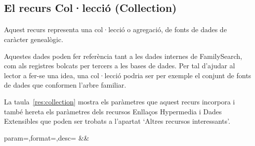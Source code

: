 \subsection{El recurs Col·lecció (Collection)}

    \paragraph{}
    Aquest recurs representa una col·lecció o agregació, de fonts de dades de caràcter genealògic.

    Aquestes dades poden fer referència tant a les dades internes de FamilySearch, com als registres bolcats per tercers a les bases de dades. Per tal d'ajudar al lector a fer-se una idea, una col·lecció podria ser per exemple el conjunt de fonts de dades que conformen l'arbre familiar.

    La taula~\ref{res:collection} mostra els paràmetres que aquest recurs incorpora i també hereta els paràmetres dels recursos Enllaços Hypermedia i Dades Extensibles que poden ser trobats a l'apartat `Altres recursos interessants'.

    \begin{center}
             {param=\param,format=\format,desc=\desc}
             {\param&\format&\desc}
     \end{center}

